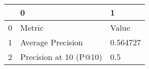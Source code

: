 \begin{tabular}{lll}
\toprule
{} &                       0 &         1 \\
\midrule
0 &                  Metric &     Value \\
1 &       Average Precision &  0.564727 \\
2 &  Precision at 10 (P@10) &       0.5 \\
\bottomrule
\end{tabular}
